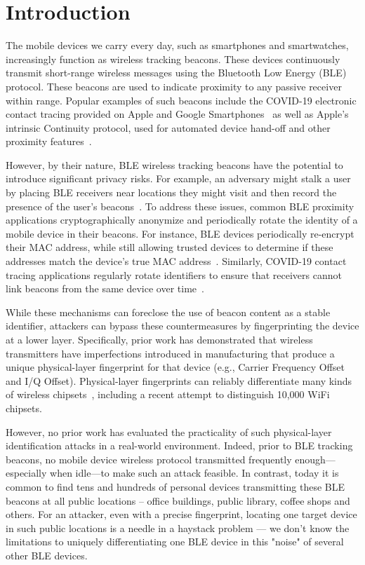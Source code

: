 \section{Introduction}

The mobile devices we carry every day, such as smartphones and
smartwatches, increasingly function as wireless tracking
beacons. These devices continuously transmit short-range wireless
messages using the Bluetooth Low Energy (BLE) protocol.  These beacons
are used to indicate proximity to any passive receiver within range.
Popular examples of such beacons include the COVID-19 electronic
contact tracing provided on Apple and Google
Smartphones~\cite{9-millionca} as well as Apple's intrinsic Continuity
protocol, used for automated device hand-off and other proximity
features~\cite{applecontinuity}.

However, by their nature, BLE wireless tracking beacons have the
potential to introduce significant privacy risks. For example, an
adversary might stalk a user by placing BLE receivers near locations
they might visit and then record the presence of the user's
beacons~\cite{exposurefaqmanual,dp3t}.  To address these issues, common BLE proximity
applications cryptographically anonymize and periodically rotate the
identity of a mobile device in their beacons. For instance, BLE
devices periodically re-encrypt their MAC address, while still
allowing trusted devices to determine if these addresses match the
device's true MAC address~\cite{bluetoothprivacy}. Similarly, COVID-19 contact tracing
applications regularly rotate identifiers to ensure that receivers
cannot link beacons from the same device over time~\cite{exposurenotificationmanual}.

While these mechanisms can foreclose the use of beacon content as a
stable identifier, attackers can bypass these countermeasures by
fingerprinting the device at a lower layer. Specifically, prior work
has demonstrated that wireless transmitters have imperfections
introduced in manufacturing that produce a unique physical-layer
fingerprint for that device (e.g., Carrier Frequency Offset and I/Q
Offset). Physical-layer fingerprints can reliably differentiate many
kinds of wireless chipsets~\cite{rfidphysical_danev,Brik_radiometric,transientBT_Hall,suskitransient,tximperfections_polak,femtocell_kennedy,adsb,subgrfid}, including a recent attempt to
distinguish 10,000 WiFi~\cite{kaushik10000wifi} chipsets.

However, no prior work has evaluated the
practicality of such physical-layer identification attacks in a real-world
environment. 
%
Indeed, prior to BLE tracking beacons, no mobile device wireless
protocol transmitted frequently enough---especially when idle---to make
such an attack feasible. 
%
In contrast, today it is common to find tens and hundreds of personal devices transmitting these BLE beacons at all public locations -- office buildings, public library, coffee shops and others.
%
For an attacker, even with a precise fingerprint, locating one target device in such public locations is a needle in a haystack problem --- we don't know the limitations to uniquely differentiating one BLE device in this "noise" of several other BLE devices.
%

